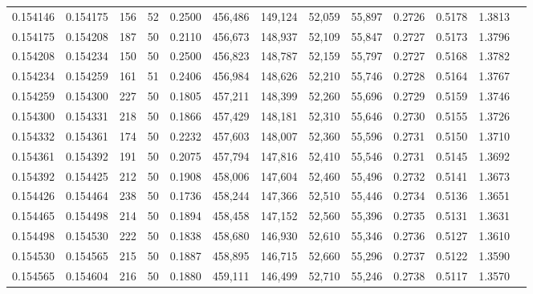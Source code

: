 \begin{tabular}{rrrrrrrrrrrrr}
0.154146 & 0.154175 &   156 &  52 &                                     0.2500 & 456,486 & 149,124 &  52,059 &  55,897 & 0.2726 & 0.5178 & 1.3813 \\
0.154175 & 0.154208 &   187 &  50 &                                     0.2110 & 456,673 & 148,937 &  52,109 &  55,847 & 0.2727 & 0.5173 & 1.3796 \\
0.154208 & 0.154234 &   150 &  50 &                                     0.2500 & 456,823 & 148,787 &  52,159 &  55,797 & 0.2727 & 0.5168 & 1.3782 \\
0.154234 & 0.154259 &   161 &  51 &                                     0.2406 & 456,984 & 148,626 &  52,210 &  55,746 & 0.2728 & 0.5164 & 1.3767 \\
0.154259 & 0.154300 &   227 &  50 &                                     0.1805 & 457,211 & 148,399 &  52,260 &  55,696 & 0.2729 & 0.5159 & 1.3746 \\
0.154300 & 0.154331 &   218 &  50 &                                     0.1866 & 457,429 & 148,181 &  52,310 &  55,646 & 0.2730 & 0.5155 & 1.3726 \\
0.154332 & 0.154361 &   174 &  50 &                                     0.2232 & 457,603 & 148,007 &  52,360 &  55,596 & 0.2731 & 0.5150 & 1.3710 \\
0.154361 & 0.154392 &   191 &  50 &                                     0.2075 & 457,794 & 147,816 &  52,410 &  55,546 & 0.2731 & 0.5145 & 1.3692 \\
0.154392 & 0.154425 &   212 &  50 &                                     0.1908 & 458,006 & 147,604 &  52,460 &  55,496 & 0.2732 & 0.5141 & 1.3673 \\
0.154426 & 0.154464 &   238 &  50 &                                     0.1736 & 458,244 & 147,366 &  52,510 &  55,446 & 0.2734 & 0.5136 & 1.3651 \\
0.154465 & 0.154498 &   214 &  50 &                                     0.1894 & 458,458 & 147,152 &  52,560 &  55,396 & 0.2735 & 0.5131 & 1.3631 \\
0.154498 & 0.154530 &   222 &  50 &                                     0.1838 & 458,680 & 146,930 &  52,610 &  55,346 & 0.2736 & 0.5127 & 1.3610 \\
0.154530 & 0.154565 &   215 &  50 &                                     0.1887 & 458,895 & 146,715 &  52,660 &  55,296 & 0.2737 & 0.5122 & 1.3590 \\
0.154565 & 0.154604 &   216 &  50 &                                     0.1880 & 459,111 & 146,499 &  52,710 &  55,246 & 0.2738 & 0.5117 & 1.3570 \\

\end{tabular}
